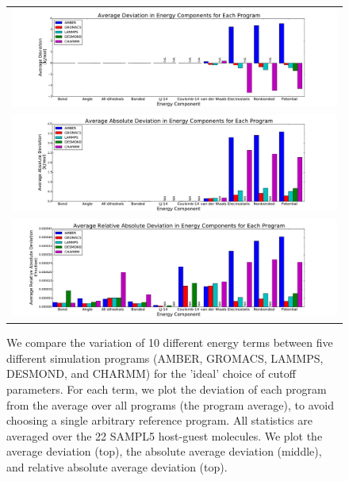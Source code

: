 \begin{figure}[h]
\begin{tabular}{c}
\includegraphics[width=\textwidth]{AverageIdealSettings.pdf} \\  
\includegraphics[width=\textwidth]{AverageAbsoluteIdealSettings.pdf} \\  
\includegraphics[width=\textwidth]{AverageRelativeAbsoluteIdealSettings.pdf}
\end{tabular}
\caption{We compare the variation of 10 different energy terms between
  five different simulation programs (AMBER, GROMACS, LAMMPS, DESMOND,
  and CHARMM) for the 'ideal' choice of cutoff parameters. For each
  term, we plot the deviation of each program from the average over
  all programs (the program average), to avoid choosing a single
  arbitrary reference program. All statistics are averaged over the 22
  SAMPL5 host-guest molecules. We plot the average deviation (top),
  the absolute average deviation (middle), and relative absolute
  average deviation (top).
\label{fig:mainfig}}
\end{figure}


